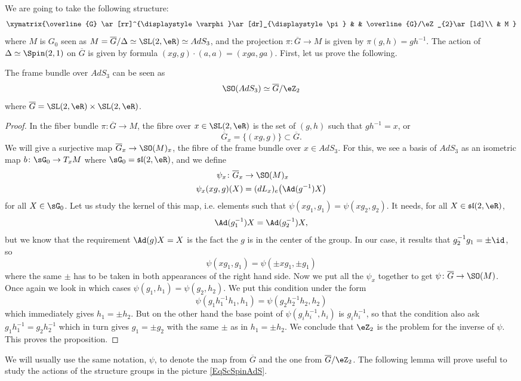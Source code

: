 We are going to take the following structure:
\begin{equation}  \label{EqScSpinAdS}
  \xymatrix{%
   \overline{G} \ar[rr]^{\displaystyle\varphi}\ar[dr]_{\displaystyle\pi}    &   &   \overline{G}/\eZ_{2}\ar[ld]\\
                        & M 
}
\end{equation}
where $M$ is $G_0$ seen as $M=\overline{G}/\Delta\simeq \SL(2,\eR)\simeq AdS_3$, and the projection $\pi\colon \overline{G}\to M$ is given by $\pi(g,h)=gh^{-1}$. The action of $\Delta\simeq \Spin(2,1)$ on $\overline{G}$ is given by formula $(xg,g)\cdot (a,a)=(xga,ga)$. First, let us prove the following.
\begin{proposition}
The frame bundle over $AdS_3$ can be seen as 
\[ 
  \SO(AdS_3)\simeq \overline{G}/\eZ_{2}
\]
where $\overline{G}=\SL(2,\eR)\times\SL(2,\eR)$.
\end{proposition}

\begin{proof}
In the fiber bundle $\pi\colon \overline{G}\to M$, the fibre over $x\in\SL(2,\eR)$ is the set of $(g,h)$ such that $gh^{-1}=x$, or
\[ 
  \overline{G}_{x}=\{ (xg,g) \}\subset \overline{G}.
\]
We will give a surjective map $\overline{G}_{x}\to\SO(M)_{x}$, the fibre of the frame bundle over $x\in AdS_3$. For this, we see a basis of $AdS_3$ as an isometric map $b\colon \sG_0\to T_{x}M$ where $\sG_{0}=\mathfrak{sl}(2,\eR)$, and we define
\begin{equation}
\begin{aligned}
 \psi_{x}\colon \overline{G}_{x}&\to \SO(M)_{x} \\ 
\psi_{x}(xg,g)(X)&=(dL_{x})_{e}\big( \Ad(g^{-1})X \big)
\end{aligned}
\end{equation}
for all $X\in\sG_0$. Let us study the kernel of this map, i.e. elements such that $\psi(xg_1,g_1)=\psi(xg_2,g_2)$. It needs, for all $X\in\mathfrak{sl}(2,\eR)$,
\[ 
  \Ad(g_1^{-1})X=\Ad(g_2^{-1})X,
\]
but we know that the requirement $\Ad(g)X=X$ is the fact the $g$ is in the center of the group. In our case, it results that $g_2^{-1}g_1=\pm\id$, so
\[ 
  \psi(xg_1,g_1)=\psi(\pm xg_1,\pm g_1)
\]
where the same $\pm$ has to be taken in both appearances of the right hand side. Now we put all the $\psi_{x}$ together to get $\psi\colon \overline{G}\to \SO(M)$. Once again we look in which cases $\psi(g_1,h_1)=\psi(g_2,h_2)$. We put this condition under the form
\[ 
  \psi(g_1h_1^{-1}h_1,h_1)=\psi(g_2h_2^{-1}h_2,h_2)
\]
which immediately gives $h_1=\pm h_2$. But on the other hand the base point of $\psi(g_{i}h_{i}^{-1},h_{i})$ is $g_{i}h_{i}^{-1}$, so that the condition also ask $g_1h_1^{-1}=g_2h_2^{-1}$ which in turn gives $g_1=\pm g_2$ with the same $\pm$ as in $h_1=\pm h_2$. We conclude that $\eZ_{2}$ is the problem for the inverse of $\psi$. This proves the proposition.
\end{proof}
We will usually use the same notation, $\psi$, to denote the map from $\overline{G}$ and the one from $\overline{G}/\eZ_{2}$. The following lemma will prove useful to study the actions of the structure groups in the picture \eqref{EqScSpinAdS}.

